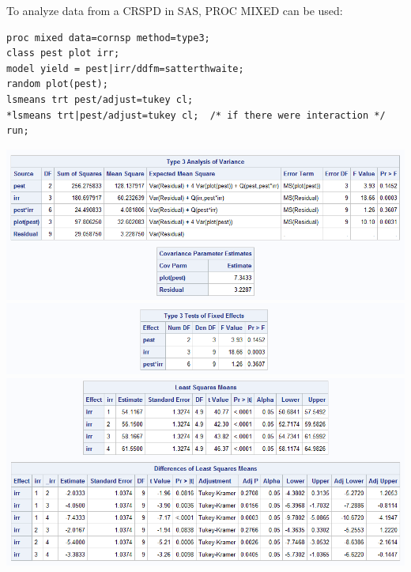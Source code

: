 To analyze data from a CRSPD in SAS, PROC MIXED can be used:

\begin{small}
\begin{verbatim}
proc mixed data=cornsp method=type3;
class pest plot irr;
model yield = pest|irr/ddfm=satterthwaite;
random plot(pest);
lsmeans trt pest/adjust=tukey cl;
*lsmeans trt|pest/adjust=tukey cl;  /* if there were interaction */
run;
\end{verbatim}
\end{small}

\begin{center}
\includegraphics[scale=0.7]{CornSp1}\\
\includegraphics[scale=0.7]{CornSp2}\\
\includegraphics[scale=0.7]{CornSp3}\\
\end{center}

\newpage

